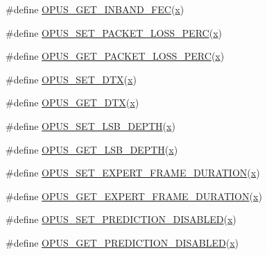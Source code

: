 \begin{DoxyCompactItemize}
\item 
\#define \hyperlink{group__opus__encoderctls_gaf792b27a6277ddf786413dbf472d0ac8}{O\+P\+U\+S\+\_\+\+G\+E\+T\+\_\+\+I\+N\+B\+A\+N\+D\+\_\+\+F\+EC}(\hyperlink{fmaths_8inl_a7ba8ab2f1e8f362163e17da3f15a5db9}{x})
\item 
\#define \hyperlink{group__opus__encoderctls_gafda1c951dea919ba54432cd03827f1a9}{O\+P\+U\+S\+\_\+\+S\+E\+T\+\_\+\+P\+A\+C\+K\+E\+T\+\_\+\+L\+O\+S\+S\+\_\+\+P\+E\+RC}(\hyperlink{fmaths_8inl_a7ba8ab2f1e8f362163e17da3f15a5db9}{x})
\item 
\#define \hyperlink{group__opus__encoderctls_gaa79261c6a55444993fca8d3a3a29d519}{O\+P\+U\+S\+\_\+\+G\+E\+T\+\_\+\+P\+A\+C\+K\+E\+T\+\_\+\+L\+O\+S\+S\+\_\+\+P\+E\+RC}(\hyperlink{fmaths_8inl_a7ba8ab2f1e8f362163e17da3f15a5db9}{x})
\item 
\#define \hyperlink{group__opus__encoderctls_ga4f053b2db8c5162293213aabfe123773}{O\+P\+U\+S\+\_\+\+S\+E\+T\+\_\+\+D\+TX}(\hyperlink{fmaths_8inl_a7ba8ab2f1e8f362163e17da3f15a5db9}{x})
\item 
\#define \hyperlink{group__opus__encoderctls_gaafbb44454e9f57232b85e4e087337ded}{O\+P\+U\+S\+\_\+\+G\+E\+T\+\_\+\+D\+TX}(\hyperlink{fmaths_8inl_a7ba8ab2f1e8f362163e17da3f15a5db9}{x})
\item 
\#define \hyperlink{group__opus__encoderctls_gaa23940eb477ff617edc14b8d66e104c0}{O\+P\+U\+S\+\_\+\+S\+E\+T\+\_\+\+L\+S\+B\+\_\+\+D\+E\+P\+TH}(\hyperlink{fmaths_8inl_a7ba8ab2f1e8f362163e17da3f15a5db9}{x})
\item 
\#define \hyperlink{group__opus__encoderctls_gab5ecdfbbbabfaefc2f2ca79cf4a3b08f}{O\+P\+U\+S\+\_\+\+G\+E\+T\+\_\+\+L\+S\+B\+\_\+\+D\+E\+P\+TH}(\hyperlink{fmaths_8inl_a7ba8ab2f1e8f362163e17da3f15a5db9}{x})
\item 
\#define \hyperlink{group__opus__encoderctls_gab3764c1b899b2bbe435e1168d3e24b6e}{O\+P\+U\+S\+\_\+\+S\+E\+T\+\_\+\+E\+X\+P\+E\+R\+T\+\_\+\+F\+R\+A\+M\+E\+\_\+\+D\+U\+R\+A\+T\+I\+ON}(\hyperlink{fmaths_8inl_a7ba8ab2f1e8f362163e17da3f15a5db9}{x})
\item 
\#define \hyperlink{group__opus__encoderctls_gab22cbb0bccdd29f58a858c0b3c10756a}{O\+P\+U\+S\+\_\+\+G\+E\+T\+\_\+\+E\+X\+P\+E\+R\+T\+\_\+\+F\+R\+A\+M\+E\+\_\+\+D\+U\+R\+A\+T\+I\+ON}(\hyperlink{fmaths_8inl_a7ba8ab2f1e8f362163e17da3f15a5db9}{x})
\item 
\#define \hyperlink{group__opus__encoderctls_ga0a73d613f6d9d601b32535fd37f58482}{O\+P\+U\+S\+\_\+\+S\+E\+T\+\_\+\+P\+R\+E\+D\+I\+C\+T\+I\+O\+N\+\_\+\+D\+I\+S\+A\+B\+L\+ED}(\hyperlink{fmaths_8inl_a7ba8ab2f1e8f362163e17da3f15a5db9}{x})
\item 
\#define \hyperlink{group__opus__encoderctls_ga6f174467d0e244917d1cc736f9033f1d}{O\+P\+U\+S\+\_\+\+G\+E\+T\+\_\+\+P\+R\+E\+D\+I\+C\+T\+I\+O\+N\+\_\+\+D\+I\+S\+A\+B\+L\+ED}(\hyperlink{fmaths_8inl_a7ba8ab2f1e8f362163e17da3f15a5db9}{x})
\end{DoxyCompactItemize}


